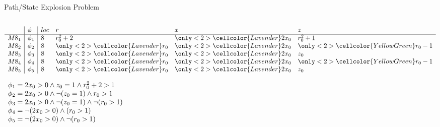 \documentclass[xcolor={dvipsnames,table},16pt]{beamer}
\begin{document}
\begin{frame}{Path/State Explosion Problem}

\begin{columns}

\begin{column}{0.55\textwidth}
\begin{overlayarea}{\columnwidth}{.8\textheight}
\footnotesize

$
\begin{array}{l|l|llll}
	     & \pc   & loc & r                                 & x                                     & z       \\ \hline
	M8_1 & \pc_1 & 8   & r_0^2 + 2                         & \only<2>{\cellcolor{Lavender}}2x_0 & r_0^2 + 1  \\
	M8_2 & \pc_2 & 8   & \only<2>{\cellcolor{Lavender}}r_0 & \only<2>{\cellcolor{Lavender}}2x_0 & \only<2>{\cellcolor{YellowGreen}}r_0 - 1 \\
	M8_3 & \pc_3 & 8   & \only<2>{\cellcolor{Lavender}}r_0 & \only<2>{\cellcolor{Lavender}}2x_0 & z_0     \\
	M8_4 & \pc_4 & 8   & \only<2>{\cellcolor{Lavender}}r_0 & \only<2>{\cellcolor{Lavender}}2x_0 & \only<2>{\cellcolor{YellowGreen}}r_0 - 1 \\
	M8_5 & \pc_5 & 8   & \only<2>{\cellcolor{Lavender}}r_0 & \only<2>{\cellcolor{Lavender}}2x_0 & z_0
\end{array}
$

$
\begin{array}{l}
\phi_1 = 2x_0>0 \land z_0 = 1 \land r_0^2 + 2 > 1             \\
\phi_2 = 2x_0>0 \land \neg(z_0 = 1) \land r_0 > 1       \\
\phi_3 = 2x_0>0 \land \neg(z_0 = 1) \land \neg(r_0 > 1) \\
\phi_4 = \neg(2x_0>0) \land (r_0 > 1)                   \\
\phi_5 = \neg(2x_0>0) \land \neg(r_0 > 1)               \\
\end{array}
$

\bigskip

\end{overlayarea}
\end{column}
\end{columns}
\end{frame}
\end{document}
